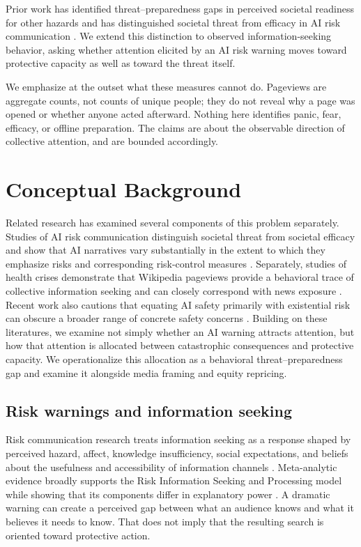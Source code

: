 \elsevierclasstrue\documentclass[preprint,12pt]{elsarticle}%
\begin{document}
Prior work has identified threat--preparedness gaps in perceived societal readiness for other hazards \citep{howarth2025heat} and has distinguished societal threat from efficacy in AI risk communication \citep{schwarz2024rage,schwarz2024mediated}. We extend this distinction to observed information-seeking behavior, asking whether attention elicited by an AI risk warning moves toward protective capacity as well as toward the threat itself.

We emphasize at the outset what these measures cannot do. Pageviews are aggregate counts, not counts of unique people; they do not reveal why a page was opened or whether anyone acted afterward. Nothing here identifies panic, fear, efficacy, or offline preparation. The claims are about the observable direction of collective attention, and are bounded accordingly.


\section{Conceptual Background}

Related research has examined several components of this problem separately. Studies of AI risk communication distinguish societal threat from societal efficacy and show that AI narratives vary substantially in the extent to which they emphasize risks and corresponding risk-control measures \citep{schwarz2024rage,schwarz2024mediated}. Separately, studies of health crises demonstrate that Wikipedia pageviews provide a behavioral trace of collective information seeking and can closely correspond with news exposure \citep{tizzoni2020zika,gozzi2020covid}. Recent work also cautions that equating AI safety primarily with existential risk can obscure a broader range of concrete safety concerns \citep{gyevnar2025safety}. Building on these literatures, we examine not simply whether an AI warning attracts attention, but how that attention is allocated between catastrophic consequences and protective capacity. We operationalize this allocation as a behavioral threat--preparedness gap and examine it alongside media framing and equity repricing. 


\subsection{Risk warnings and information seeking}

Risk communication research treats information seeking as a response shaped by perceived hazard, affect, knowledge insufficiency, social expectations, and beliefs about the usefulness and accessibility of information channels \citep{griffin1999risp,kahlor2010prism}. 
Meta-analytic evidence broadly supports the Risk Information Seeking and Processing model while showing that its components differ in explanatory power \citep{yang2014meta}. A dramatic warning can create a perceived gap between what an audience knows and what it believes it needs to know. That does not imply that the resulting search is oriented toward protective action.
\end{document}

